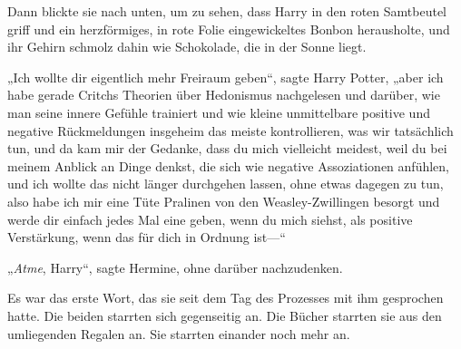 Dann blickte sie nach unten, um zu sehen, dass Harry in den roten Samtbeutel griff und ein herzförmiges, in rote Folie eingewickeltes Bonbon herausholte, und ihr Gehirn schmolz dahin wie Schokolade, die in der Sonne liegt.

„Ich wollte dir eigentlich mehr Freiraum geben“, sagte Harry Potter, „aber ich habe gerade Critchs Theorien über Hedonismus nachgelesen und darüber, wie man seine innere Gefühle trainiert und wie kleine unmittelbare positive und negative Rückmeldungen insgeheim das meiste kontrollieren, was wir tatsächlich tun, und da kam mir der Gedanke, dass du mich vielleicht meidest, weil du bei meinem Anblick an Dinge denkst, die sich wie negative Assoziationen anfühlen, und ich wollte das nicht länger durchgehen lassen, ohne etwas dagegen zu tun, also habe ich mir eine Tüte Pralinen von den Weasley-Zwillingen besorgt und werde dir einfach jedes Mal eine geben, wenn du mich siehst, als positive Verstärkung, wenn das für dich in Ordnung ist—“

„\emph{Atme}, Harry“, sagte Hermine, ohne darüber nachzudenken.




Es war das erste Wort, das sie seit dem Tag des Prozesses mit ihm gesprochen hatte. Die beiden starrten sich gegenseitig an. Die Bücher starrten sie aus den umliegenden Regalen an. Sie starrten einander noch mehr an.

